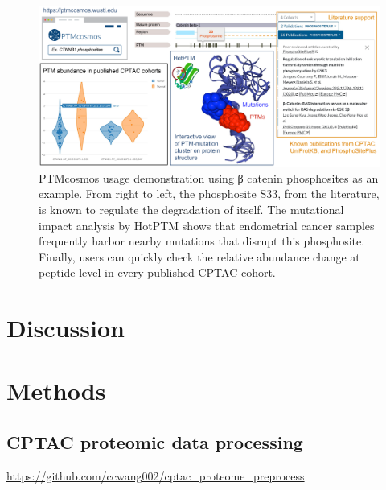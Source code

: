 \begin{figure}[tb]
    \centering
    \includegraphics[width=\linewidth]{figures/chap03_ptmcosmos/fig3_ptmcosmos_usage.pdf}
    \caption[PTMcosmos usage demonstration.]{%
        PTMcosmos usage demonstration using β catenin phosphosites as an example. From right to left, the phosphosite S33, from the literature, is known to regulate the degradation of itself. The mutational impact analysis by HotPTM shows that endometrial cancer samples frequently harbor nearby mutations that disrupt this phosphosite. Finally, users can quickly check the relative abundance change at peptide level in every published CPTAC cohort.
    }
    \label{fig:ptmcosmos-usage-demo}
\end{figure}


\section{Discussion}



\section{Methods}

\subsection{CPTAC proteomic data processing}

 \url{https://github.com/ccwang002/cptac_proteome_preprocess}


